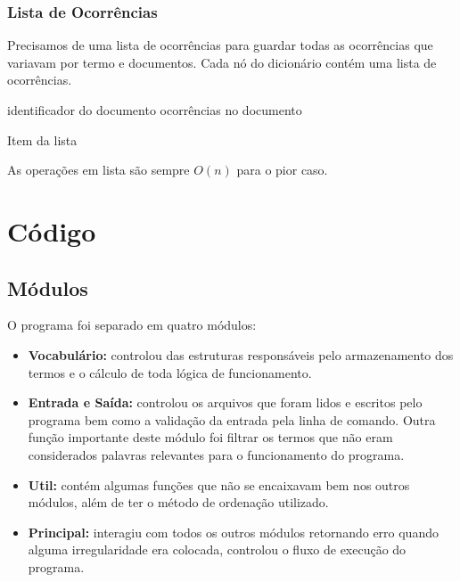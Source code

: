 \documentclass[12pt]{article}
\begin{document}
\subsubsection{Lista de Ocorrências}

Precisamos de uma lista de ocorrências para guardar todas as ocorrências que
variavam por termo e documentos. Cada nó do dicionário contém uma lista de
ocorrências.

\begin{algorithm}[h!]
\begin{footnotesize}
	identificador do documento\;
	ocorrências no documento\;
\caption{Item da lista}
\end{footnotesize}
\end{algorithm}

As operações em lista são sempre $O(n)$ para o pior caso.

\section{Código}

\subsection{Módulos}
O programa foi separado em quatro módulos:
\begin{itemize}
\item \textbf{Vocabulário:} controlou das estruturas responsáveis pelo
armazenamento dos termos e o cálculo de toda lógica de funcionamento.
\item \textbf{Entrada e Saída:}  controlou os arquivos que foram lidos e
escritos pelo programa bem como a validação da entrada pela linha de comando.
Outra função importante deste módulo foi filtrar os termos que não eram
considerados palavras relevantes para o funcionamento do programa.
\item \textbf{Util:} contém algumas funções que não se encaixavam bem nos outros
módulos, além de ter o método de ordenação utilizado.
\item \textbf{Principal:} interagiu com todos os outros módulos retornando erro
quando alguma irregularidade era colocada, controlou o fluxo de execução do
programa.
\end{itemize}
\end{document}

